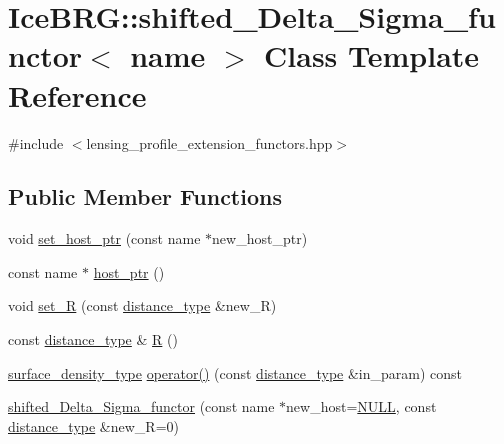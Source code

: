 \hypertarget{classIceBRG_1_1shifted__Delta__Sigma__functor}{}\section{Ice\+B\+R\+G\+:\+:shifted\+\_\+\+Delta\+\_\+\+Sigma\+\_\+functor$<$ name $>$ Class Template Reference}
\label{classIceBRG_1_1shifted__Delta__Sigma__functor}


{\ttfamily \#include $<$lensing\+\_\+profile\+\_\+extension\+\_\+functors.\+hpp$>$}

\subsection*{Public Member Functions}
\begin{DoxyCompactItemize}
\item 
void \hyperlink{classIceBRG_1_1shifted__Delta__Sigma__functor_a2bd009ea31f1e18682211ed44870a1a9}{set\+\_\+host\+\_\+ptr} (const name $\ast$new\+\_\+host\+\_\+ptr)
\item 
const name $\ast$ \hyperlink{classIceBRG_1_1shifted__Delta__Sigma__functor_a324af3df928b93e23413866d4e099a3a}{host\+\_\+ptr} ()
\item 
void \hyperlink{classIceBRG_1_1shifted__Delta__Sigma__functor_a82c45f87daa763cc4f0095b6ad725c0f}{set\+\_\+\+R} (const \hyperlink{namespaceIceBRG_a45499647eb87e24c10ab32c628711cec}{distance\+\_\+type} \&new\+\_\+\+R)
\item 
const \hyperlink{namespaceIceBRG_a45499647eb87e24c10ab32c628711cec}{distance\+\_\+type} \& \hyperlink{classIceBRG_1_1shifted__Delta__Sigma__functor_a03ab67eec9e4f2ee4de6cf8b8214f9b0}{R} ()
\item 
\hyperlink{namespaceIceBRG_a80c597ef5ba0a32491d32a9f0083b02d}{surface\+\_\+density\+\_\+type} \hyperlink{classIceBRG_1_1shifted__Delta__Sigma__functor_aee4ca5d44f4649e03d80d229b9a2f05d}{operator()} (const \hyperlink{namespaceIceBRG_a45499647eb87e24c10ab32c628711cec}{distance\+\_\+type} \&in\+\_\+param) const 
\item 
\hyperlink{classIceBRG_1_1shifted__Delta__Sigma__functor_a01d15cd18fde3dafb9128aceb49da3ae}{shifted\+\_\+\+Delta\+\_\+\+Sigma\+\_\+functor} (const name $\ast$new\+\_\+host=\hyperlink{lib_2IceBRG__main_2common_8h_a070d2ce7b6bb7e5c05602aa8c308d0c4}{N\+U\+L\+L}, const \hyperlink{namespaceIceBRG_a45499647eb87e24c10ab32c628711cec}{distance\+\_\+type} \&new\+\_\+\+R=0)
\end{DoxyCompactItemize}


